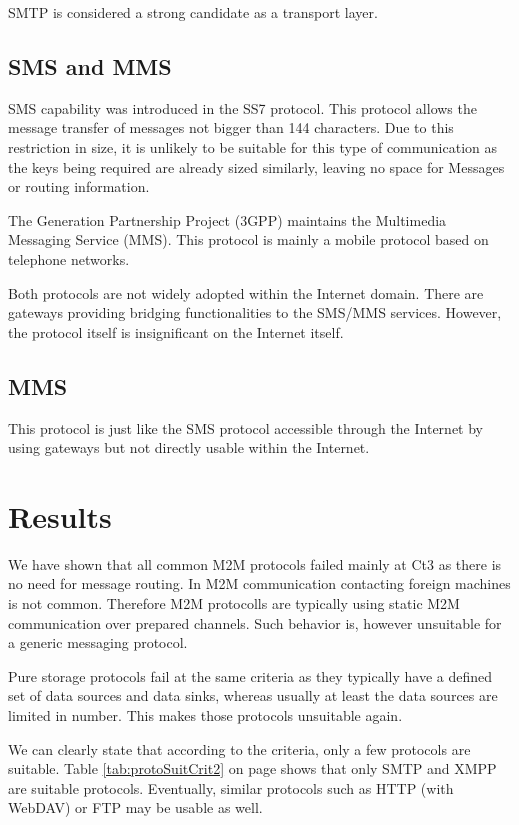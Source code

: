 \documentclass[a4paper,appendixprefix,pdfusetitle,twocolumn,fontsize=8pt,DIV=calc,8pt,draft]{\doctype} %
\begin{document}
SMTP is considered a strong candidate as a transport layer.  

\subsection{SMS and MMS}
SMS capability was introduced in the SS7 protocol. This protocol allows the message transfer of messages not bigger than 144 characters. Due to this restriction in size, it is unlikely to be suitable for this type of communication as the keys being required are already sized similarly, leaving no space for Messages or routing information.

The  Generation Partnership Project (3GPP) maintains the Multimedia Messaging Service (MMS). This protocol is mainly a mobile protocol based on telephone networks.

Both protocols are not widely adopted within the Internet domain. There are gateways providing bridging functionalities to the SMS/MMS services. However, the protocol itself is insignificant on the Internet itself. 

\subsection{MMS}
 This protocol is just like the SMS protocol accessible through the Internet by using gateways but not directly usable within the Internet.

\section{Results}
We have shown that all common M2M protocols failed mainly at Ct3 as there is no need for message routing. In M2M communication contacting foreign machines is not common. Therefore M2M protocolls are typically using static M2M communication over prepared channels. Such behavior is, however unsuitable for a generic messaging protocol.

Pure storage protocols fail at the same criteria as they typically have a defined set of data sources and data sinks, whereas usually at least the data sources are limited in number. This makes those protocols unsuitable again.

We can clearly state that according to the criteria, only a few protocols are suitable. Table \ref{tab:protoSuitCrit2} on page \pageref{tab:protoSuitCrit} shows that only SMTP and XMPP are suitable protocols. Eventually, similar protocols such as HTTP (with WebDAV) or FTP may be usable as well. 
\end{document}
